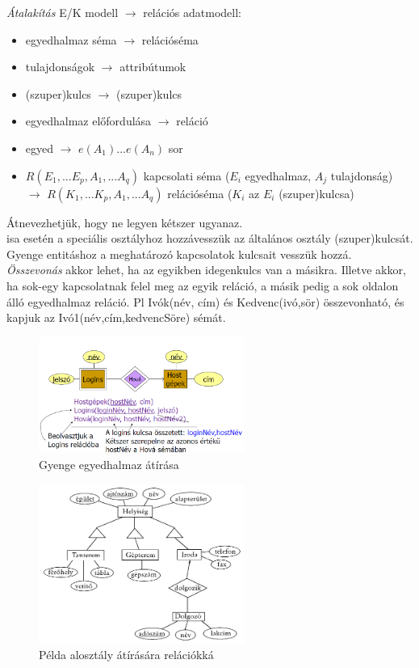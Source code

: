 \documentclass[margin=0px]{article}
\begin{document}
\textit{Átalakítás} E/K modell $\to$ relációs adatmodell:
\begin{itemize}
    \item egyedhalmaz séma $\to$ relációséma
    \item tulajdonságok $\to$ attribútumok
    \item (szuper)kulcs $\to$ (szuper)kulcs
    \item egyedhalmaz előfordulása $\to$ reláció
    \item egyed $\to$ $e(A_1)...e(A_n)$ sor
    \item $R(E_1,...E_p, A_1,...A_q)$ kapcsolati séma ($E_i$ egyedhalmaz, $A_j$ tulajdonság) $\to$ $R(K_1,...K_p, A_1,...A_q)$ relációséma ($K_i$ az $E_i$ (szuper)kulcsa)
\end{itemize}
Átnevezhetjük, hogy ne legyen kétszer ugyanaz. \\
isa esetén a speciális osztályhoz hozzávesszük az általános osztály (szuper)kulcsát. Gyenge entitáshoz a meghatározó kapcsolatok kulcsait vesszük hozzá. \\
\textit{Összevonás} akkor lehet, ha az egyikben idegenkulcs van a másikra. Illetve akkor, ha sok-egy kapcsolatnak felel meg az egyik reláció, a másik pedig a sok oldalon álló egyedhalmaz reláció. Pl Ivók(név, cím) és Kedvenc(ivó,sör) összevonható, és kapjuk az Ivó1(név,cím,kedvencSöre) sémát. \\
\begin{figure}[H]
    \centering
    \includegraphics[width=0.6\textwidth]{img/ek8.png}
    \caption{Gyenge egyedhalmaz átírása}
\end{figure}
\begin{figure}[H]
    \centering
    \includegraphics[width=0.6\textwidth]{img/ek9.png}
    \caption{Példa alosztály átírására relációkká}
\end{figure}
\end{document}
